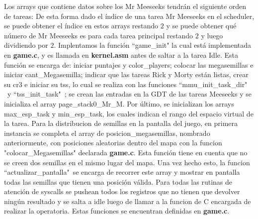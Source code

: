 \documentclass[a4paper]{article}
\begin{document}
Los arrays que contiene datos sobre los Mr Meeseeks tendrán el siguiente orden de tareas:
\justify
De esta forma dado el índice de una tarea Mr Meeseeks en el scheduler, se puede obtener el índice en estos arrays restando $2$ y se puede obtener qué número de Mr Meeseeks es para cada tarea principal restando $2$ y luego dividiendo por $2$.
\justify
Implentamos la función ``game_init" la cual está implementada en \textbf{game.c}, y es llamada en \textbf{kernel.asm} antes de saltar a la tarea Idle. Esta función se encarga de: iniciar puntajes y color_players; colocar las megasemillas e iniciar cant_Megasemilla; indicar que las tareas Rick y Morty están listas, crear su cr3 e iniciar su tss, lo cual se realiza con las funciones ``mmu_init_task_dir" \ y ``tss_init_task"\ ; se crean las entradas en la GDT de las tareas Meeseeks y se inicializa el array page_stack0_Mr_M. Por último, se inicializan los arrays max_esp_task y min_esp_task, los cuales indican el rango del espacio virtual de la tarea. 
\justify
Para la distribucion de semillas en la pantalla del juego, en primera instancia se completa el array de posicion_megasemillas, nombrado anteriormente, con posiciones aleatorias dentro del mapa con la funcion "colocar_Megasemillas" declarada \textbf{game.c}. Esta función tiene en cuenta que no se creen dos semillas en el mismo lugar del mapa. Una vez hecho esto, la funcion ``actualizar_pantalla"\ se encarga de recorrer este array y mostrar en pantalla todas las semillas que tienen una posición válida.
\justify
Para todas las rutinas de atención de syscalls se pushean todos los registros que no tienen que devolver ningún resultado y se salta a idle luego de llamar a la funcion de C encargada de realizar la operatoria. Estas funciones se encuentran definidas en \textbf{game.c}.
\justify
\end{document}
